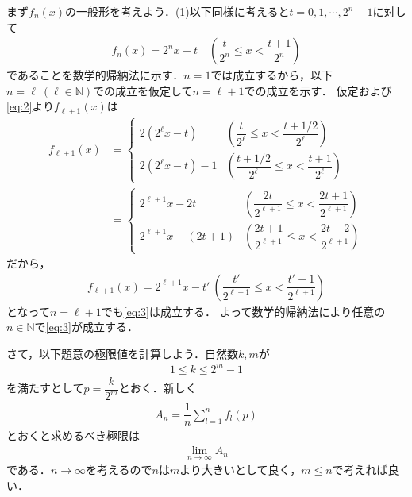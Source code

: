 \documentclass[../../main.tex]{subfiles}
\begin{document}
まず$f_n(x)$の一般形を考えよう．(1)以下同様に考えると$t=0,1,\cdots,2^n-1$に対して
\begin{align}
  f_n(x)=2^nx-t \quad \left(\dfrac{t}{2^n}\le x<\dfrac{t+1}{2^n}\right) \label{eq:3}
\end{align}
であることを数学的帰納法に示す．$n=1$では成立するから，以下$n=\ell\ (\ell\in\mathbb{N})$での成立を仮定して$n=\ell+1$での成立を示す．
仮定および\cref{eq:2}より$f_{\ell+1}(x)$は
\begin{align}
  f_{\ell+1}(x)
  &=
  \begin{cases}\displaystyle
    2(2^\ell x-t) & \left(\dfrac{t}{2^\ell}\le x<\dfrac{t+1/2}{2^\ell}\right) \\
    2(2^\ell x-t)-1 & \left(\dfrac{t+1/2}{2^\ell}\le x<\dfrac{t+1}{2^\ell}\right)
  \end{cases} \\
  &=
  \begin{cases}\displaystyle
    2^{\ell+1}x-2t & \left(\dfrac{2t}{2^{\ell+1}}\le x<\dfrac{2t+1}{2^{\ell+1}}\right) \\
    2^{\ell+1}x-(2t+1) & \left(\dfrac{2t+1}{2^{\ell+1}}\le x<\dfrac{2t+2}{2^{\ell+1}}\right)
  \end{cases}
\end{align}
だから，
\begin{align}
  f_{\ell+1}(x)=2^{\ell+1}x-t'\ \left(\dfrac{t'}{2^{\ell+1}}\le x<\dfrac{t'+1}{2^{\ell+1}}\right)
\end{align}
となって$n=\ell+1$でも\cref{eq:3}は成立する．
よって数学的帰納法により任意の$n\in\mathbb{N}$で\cref{eq:3}が成立する．


さて，以下題意の極限値を計算しよう．自然数$k,m$が
\begin{align}
  1 \le k \le 2^{m}-1 \label{eq:4}
\end{align}
を満たすとして$p=\dfrac{k}{2^m}$とおく．新しく
\begin{align}
  A_n = \dfrac{1}{n}\sum_{l=1}^{n}f_{l}(p) \label{eq:5}
\end{align}
とおくと求めるべき極限は
\begin{align}
  \lim_{n\to\infty}A_n \label{eq:6}
\end{align}
である．$n\to\infty$を考えるので$n$は$m$より大きいとして良く，$m\le n$で考えれば良い．
\end{document}
